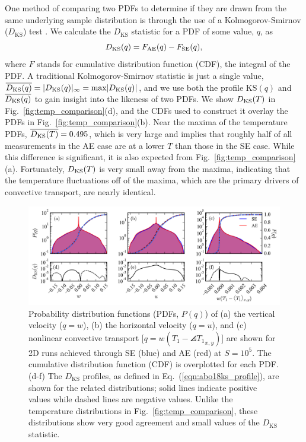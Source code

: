 One method of comparing two PDFs to determine if they are drawn from the same underlying sample distribution is through the use of a Kolmogorov-Smirnov ($D_{\text{KS}}$) test \cite{wall&jenkins2012}.
We calculate the $D_{\text{KS}}$ statistic for a PDF of some value, $q$, as
\begin{equation}
D_{\text{KS}}(q) = F_{\text{AE}}(q) - F_{\text{SE}}(q),
\label{eqn:abo18ks_profile}
\end{equation}
where $F$ stands for cumulative distribution function (CDF), the integral of the PDF.
A traditional Kolmogorov-Smirnov statistic is just a single value, $\overline{D_\text{KS}(q)} = |D_{\text{KS}}(q)|_\infty = \text{max} |D_{\text{KS}}(q)|$, and we use both the profile KS$(q)$ and $\overline{D_\text{KS}(q)}$ to gain insight into the likeness of two PDFs. 
We show $D_{\text{KS}}(T)$ in Fig.~\ref{fig:temp_comparison}(d), and the CDFs used to construct it overlay the PDFs in Fig.~\ref{fig:temp_comparison}(b).
Near the maxima of the temperature PDFs, $\overline{D_\text{KS}(T)} = 0.495$, which is very large and implies that roughly half of all measurements in the AE case are at a lower $T$ than those in the SE case.
While this difference is significant, it is also expected from Fig.~\ref{fig:temp_comparison}(a).
Fortunately, $D_{\text{KS}}(T)$ is very small away from the maxima, indicating that the temperature fluctuations off of the maxima, which are the primary drivers of convective transport, are nearly identical.

\begin{figure}[bt!]
\includegraphics[width=\textwidth]{./figs/pdf_comparison.pdf}
\caption[Probability distribution comparison of AE and SE dynamics]
{
	Probability distribution functions (PDFs, $P(q)$) of (a) the vertical velocity ($q = w$), (b) the horizontal velocity ($q = u$), and (c) nonlinear convective transport [$q = w(T_1 - \angles{T_1}_{x,y})$] are shown for 2D runs achieved through SE (blue) and AE (red) at $S = 10^{5}$.  
	The cumulative distribution function (CDF) is overplotted for each PDF. 
	(d-f) The $D_{\text{KS}}$ profiles, as defined in Eq.~(\ref{eqn:abo18ks_profile}), are shown for the related distributions; solid lines indicate positive values while dashed lines are negative values. 
	Unlike the temperature distributions in Fig.~\ref{fig:temp_comparison}, these distributions show very good agreement and small values of the $D_{\text{KS}}$ statistic.
	\label{fig:pdf_comparison} 
}
\end{figure}

